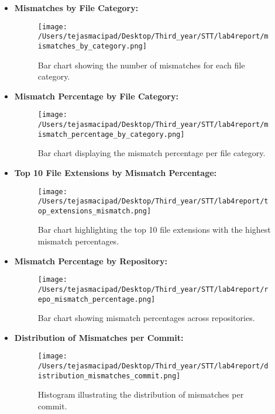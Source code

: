 \documentclass[12pt,a4paper]{article}
\begin{document}
\begin{enumerate}
\begin{itemize}
            \item \textbf{Mismatches by File Category:}  
            \begin{figure}[!h]
                \centering
                \texttt{[image: /Users/tejasmacipad/Desktop/Third\_year/STT/lab4report/mismatches\_by\_category.png]}
                \caption{Bar chart showing the number of mismatches for each file category.}
            \end{figure}

            \item \textbf{Mismatch Percentage by File Category:}  
            \begin{figure}[!h]
                \centering
                \texttt{[image: /Users/tejasmacipad/Desktop/Third\_year/STT/lab4report/mismatch\_percentage\_by\_category.png]}
                \caption{Bar chart displaying the mismatch percentage per file category.}
            \end{figure}

            \item \textbf{Top 10 File Extensions by Mismatch Percentage:}  
            \begin{figure}[!h]
                \centering
                \texttt{[image: /Users/tejasmacipad/Desktop/Third\_year/STT/lab4report/top\_extensions\_mismatch.png]}
                \caption{Bar chart highlighting the top 10 file extensions with the highest mismatch percentages.}
            \end{figure}

            \item \textbf{Mismatch Percentage by Repository:}  
            \begin{figure}[!h]
                \centering
                \texttt{[image: /Users/tejasmacipad/Desktop/Third\_year/STT/lab4report/repo\_mismatch\_percentage.png]}
                \caption{Bar chart showing mismatch percentages across repositories.}
            \end{figure}

            \item \textbf{Distribution of Mismatches per Commit:}  
            \begin{figure}[!h]
                \centering
                \texttt{[image: /Users/tejasmacipad/Desktop/Third\_year/STT/lab4report/distribution\_mismatches\_commit.png]}
                \caption{Histogram illustrating the distribution of mismatches per commit.}
            \end{figure}


\end{itemize}
\end{enumerate}
\end{document}
